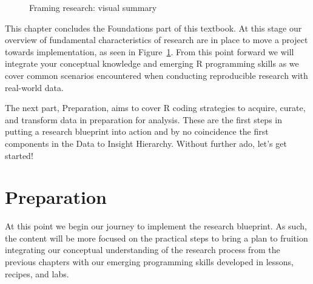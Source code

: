 \documentclass[
  letterpaper,
]{latex/krantz}
\theoremstyle{definition}
\theoremstyle{remark}
\begin{document}
\begin{figure}[H]


\caption{\label{fig-fr-visual-summary}Framing research: visual summary}

\end{figure}%

This chapter concludes the Foundations part of this textbook. At this
stage our overview of fundamental characteristics of research are in
place to move a project towards implementation, as seen in
Figure~\ref{fig-fr-visual-summary}. From this point forward we will
integrate your conceptual knowledge and emerging R programming skills as
we cover common scenarios encountered when conducting reproducible
research with real-world data.

The next part, Preparation, aims to cover R coding strategies to
acquire, curate, and transform data in preparation for analysis. These
are the first steps in putting a research blueprint into action and by
no coincidence the first components in the Data to Insight Hierarchy.
Without further ado, let's get started!

\part{Preparation}

At this point we begin our journey to implement the research blueprint.
As such, the content will be more focused on the practical steps to
bring a plan to fruition integrating our conceptual understanding of the
research process from the previous chapters with our emerging
programming skills developed in lessons, recipes, and labs.
\end{document}
